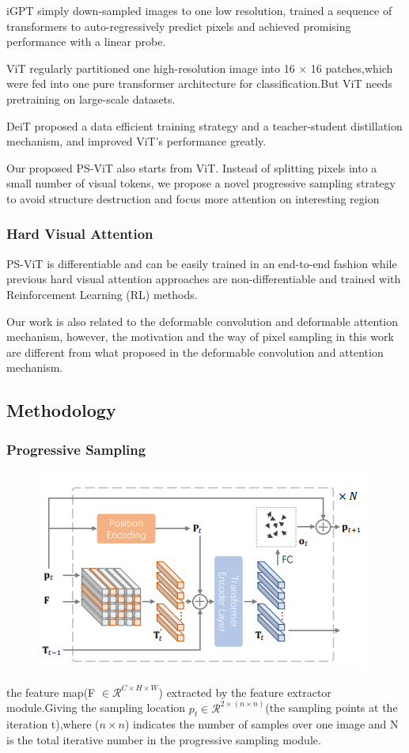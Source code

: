 \documentclass[11pt]{article}
\begin{document}
iGPT simply down-sampled images to one low resolution, trained a sequence of transformers to auto-regressively predict pixels and achieved promising performance with a linear probe.

ViT regularly partitioned one high-resolution image into 16 × 16 patches,which were fed into one pure transformer architecture for classification.But ViT needs pretraining on large-scale datasets.

DeiT proposed a data efficient training strategy and a teacher-student distillation mechanism, and improved ViT’s performance greatly.

Our proposed PS-ViT also starts from ViT. Instead of splitting pixels into a small number of visual tokens, we propose a novel progressive sampling strategy to avoid structure destruction and focus more attention on interesting region

\subsubsection{Hard Visual Attention}
PS-ViT is differentiable and can be easily trained in an end-to-end fashion while previous hard visual attention approaches are non-differentiable and trained with Reinforcement Learning (RL) methods.

Our work is also related to the deformable convolution and deformable attention mechanism, however, the motivation and the way of pixel sampling in this work are different from what proposed in the deformable convolution and attention mechanism.

\subsection{Methodology}
\subsubsection{Progressive Sampling}
\begin{figure}[h]
	\centering
	\includegraphics[scale = 0.7]{3}
\end{figure}
the feature map(F $\in \mathcal{R}^{C\times H\times W}$) extracted by the feature extractor module.Giving the sampling location $p_t\in \mathcal{R}^{2\times (n\times n)}$(the sampling points at the iteration t),where ($n\times n$) indicates the number of samples over one image and N is the total iterative number in the progressive sampling module.
\end{document}
